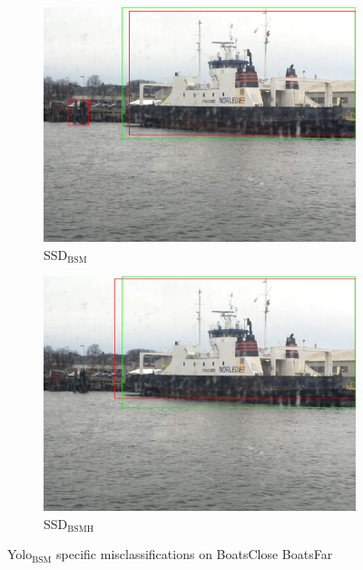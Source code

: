 \begin{figure}[h!]
\begin{subfigure}{.5\textwidth}
  \centering
  \includegraphics[width=0.8\linewidth]{results/case_buildings/ssdtrf/ssd2/3better/IMG_2570.jpg}
  \caption{SSD$_{\text{BSM}}$}
\end{subfigure}%
\begin{subfigure}{.5\textwidth}
  \centering
  \includegraphics[width=.8\linewidth]{results/case_buildings/ssdtrf/ssd3/3better/IMG_2570.jpg}
  \caption{SSD$_{\text{BSMH}}$}
\end{subfigure}
\caption{Yolo$_{\text{BSM}}$ specific misclassifications on BoatsClose BoatsFar}
\label{img:yolo2_misclas}


\end{figure}
